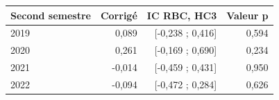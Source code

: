 \begin{tabularx}{\linewidth}{Xrrr}
\toprule
Second semestre & Corrigé & IC RBC, HC3 & Valeur p \\
\midrule
2019 & 0,089 & [-0,238 ; 0,416] & 0,594 \\
2020 & 0,261 & [-0,169 ; 0,690] & 0,234 \\
2021 & -0,014 & [-0,459 ; 0,431] & 0,950 \\
2022 & -0,094 & [-0,472 ; 0,284] & 0,626 \\
\bottomrule
\end{tabularx}
